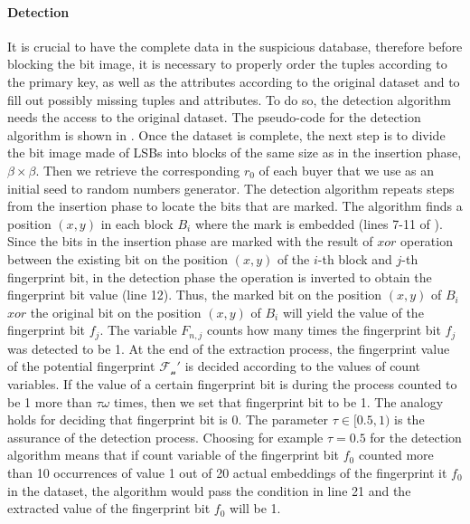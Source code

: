 \paragraph{Detection}
It is crucial to have the complete data in the suspicious database, therefore before blocking the bit image, it is necessary to properly order the tuples according to the primary key, as well as the attributes according to the original dataset and to fill out possibly missing tuples and attributes.
To do so, the detection algorithm needs the access to the original dataset.
The pseudo-code for the detection algorithm is shown in .
Once the dataset is complete, the next step is to divide the bit image made of LSBs into blocks of the same size as in the insertion phase, $\beta \times \beta$. 
Then we retrieve the corresponding $r_0$ of each buyer that we use as an initial seed to random numbers generator. 
The detection algorithm repeats steps from the insertion phase to locate the bits that are marked.
The algorithm finds a position $(x,y)$ in each block $B_i$ where the mark is embedded (lines 7-11 of ).
Since the bits in the insertion phase are marked with the result of $xor$ operation between the existing bit on the position $(x,y)$ of the $i$-th block and $j$-th fingerprint bit, in the detection phase the operation is inverted to obtain the fingerprint bit value (line 12). 
Thus, the marked bit on the position $(x,y)$ of $B_i$ $xor$ the original bit on the position $(x,y)$ of $B_i$ will yield the value of the fingerprint bit $f_j$. 
The variable $F_{n,j}$ counts how many times the fingerprint bit $f_j$ was detected to be 1.
At the end of the extraction process, the fingerprint value of the potential fingerprint $\mathcal{F_n'}$ is decided according to the values of count variables. 
If the value of a certain fingerprint bit is during the process counted to be 1 more than $\tau\omega$ times, then we set that fingerprint bit to be 1. 
The analogy holds for deciding that fingerprint bit is 0. 
The parameter $\tau \in [0.5,1)$ is the assurance of the detection process. 
Choosing for example $\tau=0.5$ for the detection algorithm means that if count variable of the fingerprint bit $f_0$ counted more than 10 occurrences of value 1 out of 20 actual embeddings of the fingerprint it $f_0$ in the dataset, the algorithm would pass the condition in line 21 and the extracted value of the fingerprint bit $f_0$ will be 1.  

